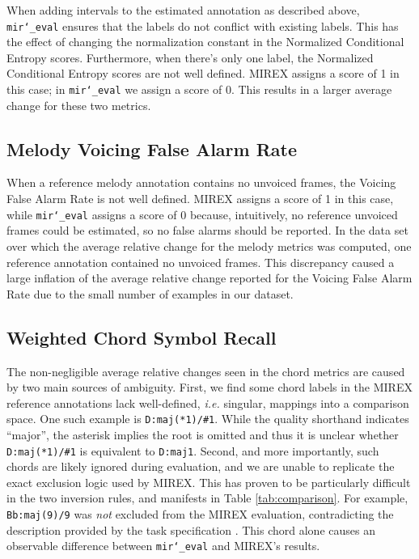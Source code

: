 \documentclass{article}
\def\ie{\emph{i.e.}}
\def\mireval{\texttt{mir\char`_eval}}
\begin{document}
When adding intervals to the estimated annotation as described above, \mireval{} ensures that the labels do not conflict with existing labels.
This has the effect of changing the normalization constant in the Normalized Conditional Entropy scores.
Furthermore, when there's only one label, the Normalized Conditional Entropy scores are not well defined.
MIREX assigns a score of 1 in this case; in \mireval{} we assign a score of 0.
This results in a larger average change for these two metrics.

\subsection{Melody Voicing False Alarm Rate}

When a reference melody annotation contains no unvoiced frames, the Voicing False Alarm Rate is not well defined.
MIREX assigns a score of 1 in this case, while \mireval{} assigns a score of 0 because, intuitively, no reference unvoiced frames could be estimated, so no false alarms should be reported.
In the data set over which the average relative change for the melody metrics was computed, one reference annotation contained no unvoiced frames.
This discrepancy caused a large inflation of the average relative change reported for the Voicing False Alarm Rate due to the small number of examples in our dataset.

\subsection{Weighted Chord Symbol Recall}
The non-negligible average relative changes seen in the chord metrics are caused by two main sources of ambiguity.
First, we find some chord labels in the MIREX reference annotations lack well-defined, \ie{} singular, mappings into a comparison space. 
One such example is \texttt{D:maj(*1)/\#1}.
While the quality shorthand indicates ``major'', the asterisk implies the root is omitted and thus it is unclear whether \texttt{D:maj(*1)/\#1} is equivalent to \texttt{D:maj1}.
Second, and more importantly, such chords are likely ignored during evaluation, and we are unable to replicate the exact exclusion logic used by MIREX.
This has proven to be particularly difficult in the two inversion rules, and manifests in Table \ref{tab:comparison}. 
For example, \texttt{Bb:maj(9)/9} was \emph{not} excluded from the MIREX evaluation, contradicting the description provided by the task specification \cite{choi2013mirex}.
This chord alone causes an observable difference between \mireval{} and MIREX's results.
\end{document}

